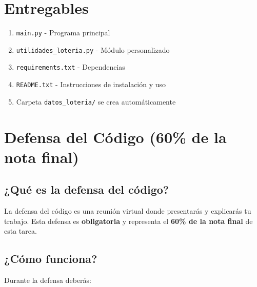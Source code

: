 \documentclass[12pt,a4paper]{article}
\begin{document}
\section{Entregables}

\begin{enumerate}[leftmargin=*]
    \item \texttt{main.py} - Programa principal
    \item \texttt{utilidades\_loteria.py} - Módulo personalizado
    \item \texttt{requirements.txt} - Dependencias
    \item \texttt{README.txt} - Instrucciones de instalación y uso
    \item Carpeta \texttt{datos\_loteria/} se crea automáticamente
\end{enumerate}

\section{Defensa del Código (60\% de la nota final)}

\subsection{¿Qué es la defensa del código?}

La defensa del código es una reunión virtual donde presentarás y explicarás tu trabajo. Esta defensa es \textbf{obligatoria} y representa el \textbf{60\% de la nota final} de esta tarea.

\subsection{¿Cómo funciona?}

Durante la defensa deberás:
\end{document}
